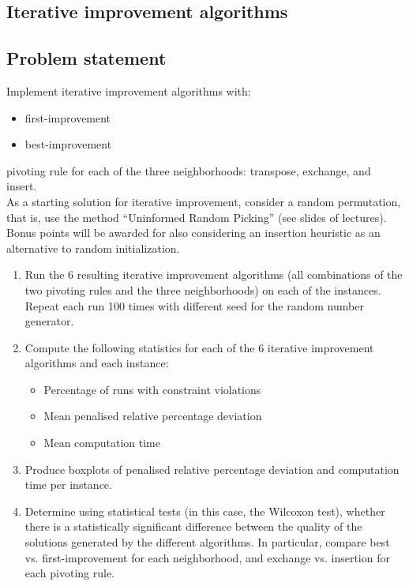 
\newpage
\begin{homeworkProblem}
\section{Iterative improvement algorithms}
\subsection{Problem statement}
Implement iterative improvement algorithms with:
\begin{itemize}
  \item first-improvement
  \item best-improvement
\end{itemize}
pivoting rule for each of the three neighborhoods: transpose, exchange, and insert. \\
As a starting solution for iterative improvement, consider a random permutation, that is, use the method “Uninformed Random Picking” (see slides of lectures). Bonus points will be awarded for also considering an insertion heuristic as an alternative to random initialization.
\begin{enumerate}
  \item Run the 6 resulting iterative improvement algorithms (all combinations of the two pivoting rules and the
three neighborhoods) on each of the instances. Repeat each run 100 times with different seed for the random
number generator.
\item Compute the following statistics for each of the 6 iterative improvement algorithms and each instance:
\begin{itemize}
  \item Percentage of runs with constraint violations
  \item Mean penalised relative percentage deviation
  \item Mean computation time
\end{itemize} 
\item Produce boxplots of penalised relative percentage deviation and computation time per instance.
\item Determine using statistical tests (in this case, the Wilcoxon test), whether there is a statistically significant difference between the quality of the solutions generated by the different algorithms.
In particular, compare best vs. first-improvement for each neighborhood, and exchange vs. insertion for each pivoting rule.
\end{enumerate}


\end{homeworkProblem}
